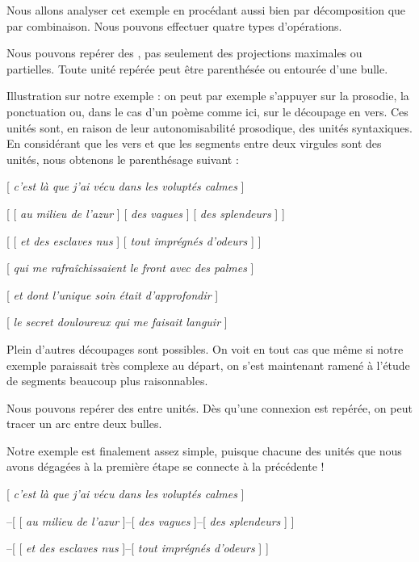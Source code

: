 Nous allons analyser cet exemple en procédant aussi bien par décomposition que par combinaison. Nous pouvons effectuer quatre types d’opérations.

\begin{tblsframed}{}
\noindent Nous pouvons repérer des , pas seulement des projections maximales ou partielles. Toute unité repérée peut être parenthésée ou entourée d’une bulle.
\end{tblsframed}

Illustration sur notre exemple : on peut par exemple s’appuyer sur la prosodie, la ponctuation ou, dans le cas d’un poème comme ici, sur le découpage en vers. Ces unités sont, en raison de leur autonomisabilité prosodique, des unités syntaxiques. En considérant que les vers et que les segments entre deux virgules sont des unités, nous obtenons le parenthésage suivant :

\ea{}
[ \textit{c’est là que j’ai vécu dans les voluptés calmes} ]

[ [ \textit{au milieu de l’azur} ] [ \textit{des vagues} ] [ \textit{des splendeurs} ] ]

[ [ \textit{et des esclaves nus} ] [ \textit{tout imprégnés d’odeurs} ] ]

[ \textit{qui me rafraîchissaient le front avec des palmes} ]

[ \textit{et dont l’unique soin était d’approfondir} ]

[ \textit{le secret douloureux qui me faisait languir} ]
\z

Plein d’autres découpages sont possibles. On voit en tout cas que même si notre exemple paraissait très complexe au départ, on s’est maintenant ramené à l’étude de segments beaucoup plus raisonnables.

\begin{tblsframed}{}
\noindent Nous pouvons repérer des  entre unités. Dès qu’une connexion est repérée, on peut tracer un arc entre deux bulles.
\end{tblsframed}

Notre exemple est finalement assez simple, puisque chacune des unités que nous avons dégagées à la première étape se connecte à la précédente !

\ea{}
[ \textit{c’est là que j’ai vécu dans les voluptés calmes} ]

–[ [ \textit{au milieu de l’azur} ]–[ \textit{des vagues} ]–[ \textit{des splendeurs} ] ]

–[ [ \textit{et des esclaves nus} ]–[ \textit{tout imprégnés d’odeurs} ] ]

